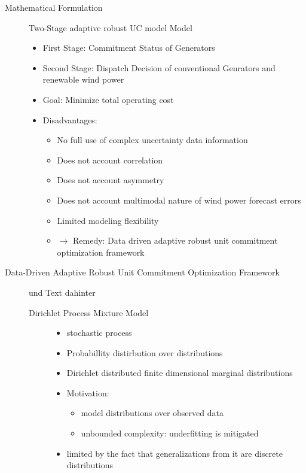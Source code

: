 \documentclass[a4paper,oneside,12pt,titlepage]{scrartcl}   %
\begin{document}
\begin{description}
	
		\item[Mathematical Formulation]
		Two-Stage adaptive robust UC model Model 
		\begin{itemize}
			\item First Stage: Commitment Status of Generators
			\item Second Stage: Dispatch Decision of conventional Genrators and renewable wind power
			\item Goal: Minimize total operating cost
			\item Disadvantages: 
			\begin{itemize}
				\item No full use of complex uncertainty data information
				\item Does not account correlation
				\item Does not account asymmetry
				\item Does not account multimodal nature of wind power forecast errors
				\item Limited modeling flexibility
				\item $\rightarrow$ Remedy: Data driven adaptive robust unit commitment optimization framework
			\end{itemize}
		\end{itemize}
		\item[Data-Driven Adaptive Robust Unit Commitment Optimization Framework] und Text dahinter
		\begin{description}
			\item[Dirichlet Process Mixture Model]
			\begin{itemize}
				\item stochastic process
				\item Probabillity distirbution over distributions
				\item Dirichlet distributed finite dimensional marginal distributions
				\item Motivation:
				\begin{itemize}
					\item model distributions over observed data
					\item unbounded complexity: underfitting is mitigated
				\end{itemize}
				\item limited by the fact that generalizations from it are discrete distributions
			\end{itemize}
		

\end{description}
\end{description}
\end{document}
